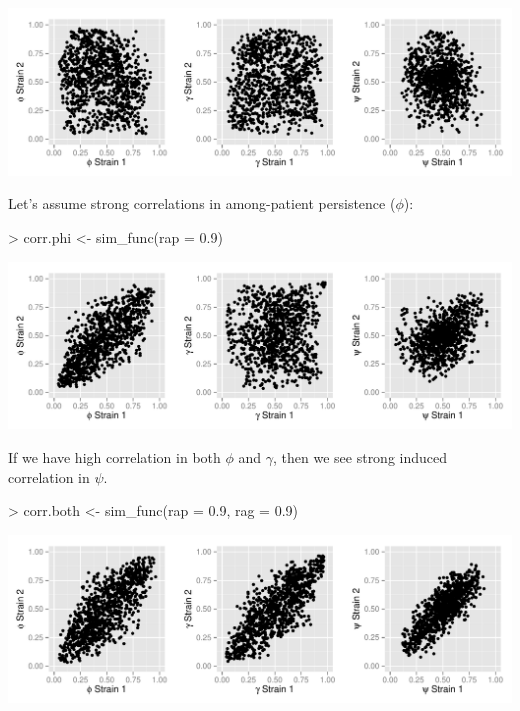 \documentclass{article}
\begin{document}
\begin{center}
\includegraphics{ReadMe-002}
\end{center}

Let's assume strong correlations in among-patient persistence ($\phi$):
\begin{Schunk}
\begin{Sinput}
> corr.phi <- sim_func(rap = 0.9)
\end{Sinput}
\end{Schunk}

\begin{center}
\includegraphics{ReadMe-004}
\end{center}

If we have high correlation in both $\phi$ and $\gamma$, then we see strong induced correlation in $\psi$.

\begin{Schunk}
\begin{Sinput}
> corr.both <- sim_func(rap = 0.9, rag = 0.9)
\end{Sinput}
\end{Schunk}

\begin{center}
\includegraphics{ReadMe-006}
\end{center}
\end{document}
